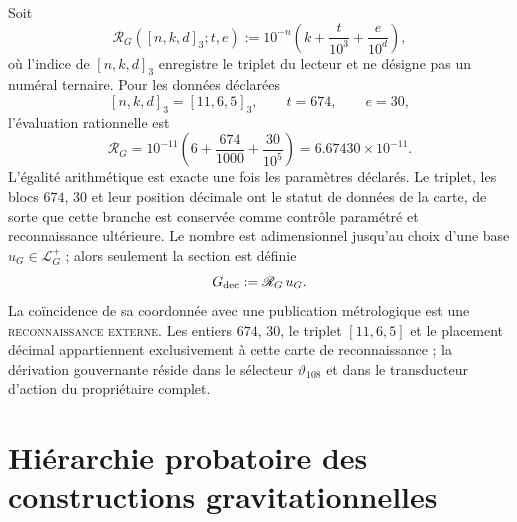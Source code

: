 Soit
\[
 \mathscr R_G([n,k,d]_3;t,e)
 :=10^{-n}\left(k+\frac{t}{10^3}+\frac{e}{10^d}\right),
\]
où l'indice de \([n,k,d]_3\) enregistre le triplet du lecteur et ne désigne pas
un numéral ternaire. Pour les données déclarées
\[
 [n,k,d]_3=[11,6,5]_3,\qquad t=674,\qquad e=30,
\]
l'évaluation rationnelle est
\[
 \boxed{
 \mathscr R_G
 =10^{-11}\left(6+\frac{674}{1000}+\frac{30}{10^5}\right)
 =6.67430\times10^{-11}.}
\]
L'égalité arithmétique est exacte une fois les paramètres déclarés. Le triplet,
les blocs \(674\), \(30\) et leur position décimale ont le statut de données
de la carte, de sorte que cette branche est conservée comme contrôle paramétré et
reconnaissance ultérieure. Le nombre est adimensionnel jusqu'au choix d'une base
\(u_G\in\mathcal L_G^+\) ; alors seulement la section est définie
\[
 G_{\rm dec}:=\mathscr R_G\,u_G.
\]
La coïncidence de sa coordonnée avec une publication métrologique est une
\textsc{reconnaissance externe}. Les entiers \(674\), \(30\), le triplet
\([11,6,5]\) et le placement décimal appartiennent exclusivement à cette carte
de reconnaissance ; la dérivation gouvernante réside dans le sélecteur
\(\vartheta_{108}\) et dans le transducteur d'action du propriétaire complet.

\section{Hiérarchie probatoire des constructions gravitationnelles}
\label{sec:cuadrado-contraste-G}

